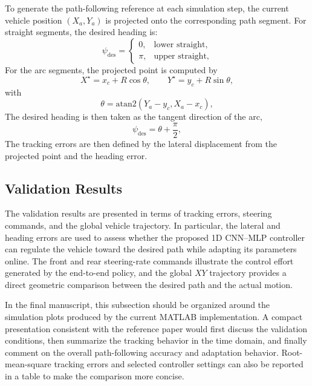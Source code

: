 \documentclass[letterpaper, journal]{IEEEtran}
\begin{document}
To generate the path-following reference at each simulation step, the current vehicle position $(X_a,Y_a)$ is projected onto the corresponding path segment. For straight segments, the desired heading is:
\begin{equation}
    \psi_{\mathrm{des}}
    =
    \begin{cases}
      0, & \text{lower straight},\\
      \pi, & \text{upper straight}
      ,
    \end{cases}
\end{equation}
For the arc segments, the projected point is computed by
\begin{equation}
  X^{\star} 
  = 
  x_c + R\cos\theta, \qquad
  Y^{\star} 
  = 
  y_c + R\sin\theta
  ,
\end{equation}
with
\begin{equation}
  \theta 
  = 
  \mathrm{atan2}(Y_a-y_c, X_a-x_c)
  ,
\end{equation}
The desired heading is then taken as the tangent direction of the arc,
\begin{equation}
  \psi_{\mathrm{des}} 
  = 
  \theta + \frac{\pi}{2}
  ,
\end{equation}
The tracking errors are then defined by the lateral displacement from the projected point and the heading error.

\subsection{Validation Results}
The validation results are presented in terms of tracking errors, steering commands, and the global vehicle trajectory. In particular, the lateral and heading errors are used to assess whether the proposed 1D CNN--MLP controller can regulate the vehicle toward the desired path while adapting its parameters online. The front and rear steering-rate commands illustrate the control effort generated by the end-to-end policy, and the global $XY$ trajectory provides a direct geometric comparison between the desired path and the actual motion.

In the final manuscript, this subsection should be organized around the simulation plots produced by the current MATLAB implementation. A compact presentation consistent with the reference paper would first discuss the validation conditions, then summarize the tracking behavior in the time domain, and finally comment on the overall path-following accuracy and adaptation behavior. Root-mean-square tracking errors and selected controller settings can also be reported in a table to make the comparison more concise.
\end{document}

